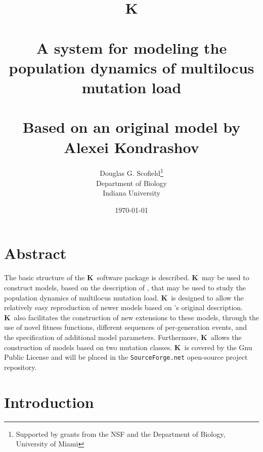 \documentclass[12pt,twoside,letterpaper,fleqn]{report}
\numberwithin{equation}{section}  %
\newcommand{\K}{{\bf K}}
\begin{document}
\title{\K \\ \  \\ A system for modeling the population dynamics of multilocus mutation load \\ \  \\ Based on an original model by Alexei Kondrashov}
\author{Douglas G. Scofield\thanks{Supported by grants from the NSF and the Department of Biology, University of Miami} \\ Department of Biology \\ Indiana University}
\date{\today}
\maketitle

\chapter*{Abstract}

The basic structure of the \K\ software package is described.  \K\ may be used to construct models, based on the description of \citet{Kondrashov:1985:5375}, that may be used to study the population dynamics of multilocus mutation load.  \K\ is designed to allow the relatively easy reproduction of newer models based on \citeauthor{Kondrashov:1985:5375}'s original description.  \K\ also facilitates the construction of new extensions to these models, through the use of novel fitness functions, different sequences of per-generation events, and the specification of additional model parameters.  Furthermore, \K\ allows the construction of models based on two mutation classes.  \K\ is covered by the Gnu Public License and will be placed in the {\tt SourceForge.net} open-source project repository.

\clearpage

\singlespacing
\tableofcontents
\listoftables
\listoffigures
\doublespacing
\clearpage
\chapter{Introduction}
\end{document}
